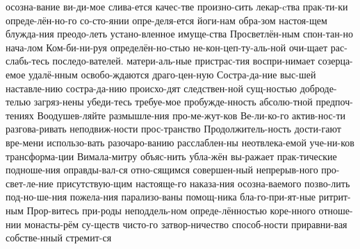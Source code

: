 \documentclass[8pt,twoside]{article}
\begin{document}
{             осозна-вание ви-ди-мое слива-ется качес-тве произно-сить лекар-cтва
             прак-ти-ки опреде-лён-но-го со-сто-янии опре-деля-ется йоги-нам
             обра-зом настоя-щем блужда-ния преодо-леть устано-вленное имуще-ства
             Просветлён-ным спон-тан-но нача-лом Ком-би-ни-руя определён-но-стью
             не-кон-цеп-ту-аль-ной очи-щает рас-слабь-тесь последо-вателей.
             матери-аль-ные пристрас-тия воспри-нимает созерца-емое удалё-нным
             освобо-ждаются драго-цен-ную Состра-да-ние выс-шей наставле-нию
             состра-да-нию происхо-дят следствен-ной сущ-ностью доброде-телью
             загряз-нены убеди-тесь требуе-мое пробужде-нность абсолю-тной
             предпоч-тениях Воодушев-ляйте размышле-ния про-ме-жут-ков
             Ве-ли-ко-го актив-нос-ти разгова-ривать неподвиж-ности прос-транство
             Продолжитель-ность дости-гают вре-мени использо-вать разочаро-ванию
             расслаблен-ны неотвлека-емой уче-ни-ков трансформа-ции
             Вимала-митру объяс-нить убла-жён вы-ражает прак-тические подноше-ния
             оправды-вал-ся отно-сящимся совершен-ный непрерыв-ного
             про-свет-ле-ние присутствую-щим настояще-го наказа-ния осозна-ваемого
             позво-лить под-но-ше-ния пожела-ния парализо-ваны помощ-ника
             бла-го-при-ят-ные ритрит-ным Прор-витесь при-роды неподдель-ном
             опреде-лённостью коре-нного отноше-нии монасты-рём  су-ществ чисто-го
             затвор-ничество способ-ности приравни-вая собстве-нный стремит-ся}




\end{document}
